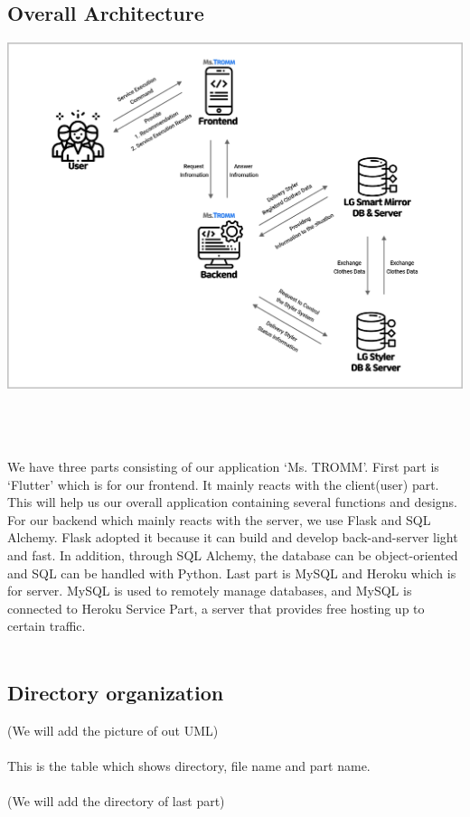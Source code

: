 \documentclass[conference]{IEEEtran}
\begin{document}
\subsection{Overall Architecture}
\centerline{\includegraphics[scale=0.15]{assets/Overall architecture.jpg}}
\\ \\ \\ We have three parts consisting of our application ‘Ms. TROMM’. First part is ‘Flutter’ which is for our frontend. It mainly reacts with the client(user) part. This will help us our overall application containing several functions and designs. For our backend which mainly reacts with the server, we use Flask and SQL Alchemy. Flask adopted it because it can build and develop back-and-server light and fast. In addition, through SQL Alchemy, the database can be object-oriented and SQL can be handled with Python. Last part is MySQL and Heroku which is for server. MySQL is used to remotely manage databases, and MySQL is connected to Heroku Service Part, a server that provides free hosting up to certain traffic.\\ \\

\subsection{Directory organization}
(We will add the picture of out UML) \\ \\
This is the table which shows directory, file name and part name.\\ \\
(We will add the directory of last part) \\ \\
\end{document}
